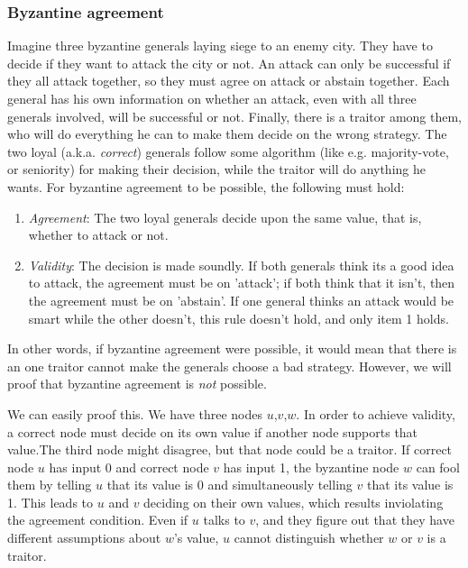 \subsubsection{Byzantine agreement}
Imagine three byzantine generals laying siege to an enemy city. They have to decide if they want to attack the city or not. An attack can only be successful if they all attack together, so they must agree on attack or abstain together. Each general has his own information on whether an attack, even with all three generals involved, will be successful or not. Finally, there is a traitor among them, who will do everything he can to make them decide on the wrong strategy. The two loyal (a.k.a. \emph{correct}) generals follow some algorithm (like e.g. majority-vote, or seniority) for making their decision, while the traitor will do anything he wants.
For byzantine agreement to be possible, the following must hold:
\begin{enumerate}
    \item \emph{Agreement}: The two loyal generals decide upon the same value, that is, whether to attack or not.
    \item \emph{Validity}: The decision is made soundly. If both generals think its a good idea to attack, the agreement must be on 'attack'; if both think that it isn't, then the agreement must be on 'abstain'. If one general thinks an attack would be smart while the other doesn't, this rule doesn't hold, and only item 1 holds.
\end{enumerate}
In other words, if byzantine agreement were possible, it would mean that there is an one traitor cannot make the generals choose a bad strategy. However, we will proof that byzantine agreement is \emph{not} possible.

We can easily proof this. We have three nodes $u$,$v$,$w$. In order to achieve validity, a correct node must decide on its own value if another node supports that value.The third node might disagree, but that node could be a traitor. If correct node $u$ has input 0 and correct node $v$ has input 1, the byzantine node $w$ can fool them by telling $u$ that its value is 0 and simultaneously telling $v$ that its value is 1. This leads to $u$ and $v$ deciding on their own values, which results inviolating the agreement condition. Even if $u$ talks to $v$, and they figure out that they have different assumptions about $w$’s value, $u$ cannot distinguish whether $w$ or $v$ is a traitor.

